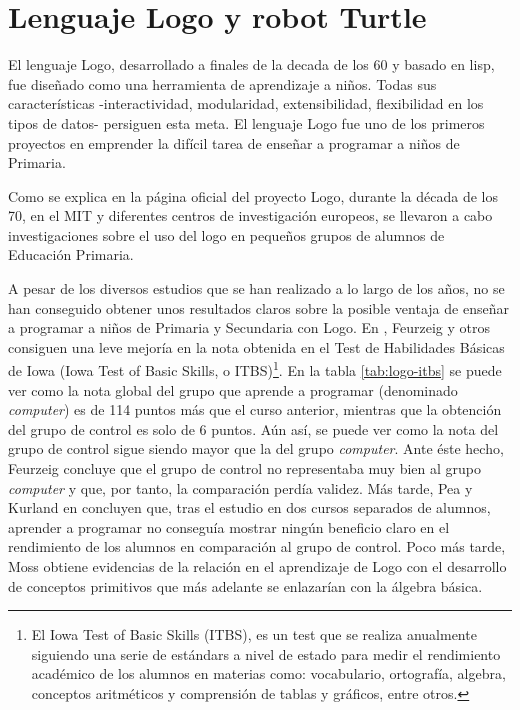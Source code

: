 \section{Lenguaje Logo y robot Turtle}
\label{sec:Logo}

El lenguaje Logo, desarrollado a finales de la decada de los 60 y basado en \Gls{lisp}, fue diseñado como una herramienta de aprendizaje a niños. Todas sus características -interactividad, modularidad, extensibilidad, flexibilidad en los tipos de datos- persiguen esta meta. El lenguaje Logo fue uno de los primeros proyectos en emprender la difícil tarea de enseñar a programar a niños de Primaria.


Como se explica en la página oficial del proyecto Logo\cite{logo}, durante la década de los 70, en el \acrfull{MIT} y diferentes centros de investigación europeos, se llevaron a cabo investigaciones sobre el uso del \Gls{logo} en pequeños grupos de alumnos de Educación Primaria.

A pesar de los diversos estudios que se han realizado a lo largo de los años, no se han conseguido obtener unos resultados claros sobre la posible ventaja de enseñar a programar a niños de Primaria y Secundaria con Logo. En \cite{feurzeig1969programming}, Feurzeig y otros consiguen una leve mejoría en la nota obtenida en el Test de Habilidades Básicas de Iowa (Iowa Test of Basic Skills, o ITBS)\footnote{El Iowa Test of Basic Skills (ITBS), es un test que se realiza anualmente siguiendo una serie de estándars a nivel de estado para medir el rendimiento académico de los alumnos en materias como: vocabulario, ortografía, algebra, conceptos aritméticos y comprensión de tablas y gráficos, entre otros.}. En la tabla \ref{tab:logo-itbs} se puede ver como la nota global del grupo que aprende a programar (denominado \emph{computer}) es de 114 puntos más que el curso anterior, mientras que la obtención del grupo de control es solo de 6 puntos. Aún así, se puede ver como la nota del grupo de control sigue siendo mayor que la del grupo \emph{computer}. Ante éste hecho, Feurzeig concluye que el grupo de control no representaba muy bien al grupo \emph{computer} y que, por tanto, la comparación perdía validez.
Más tarde, Pea y Kurland en \cite{pea1984logo} concluyen que, tras el estudio en dos cursos separados de alumnos, aprender a programar no conseguía mostrar ningún beneficio claro en el rendimiento de los alumnos en comparación al grupo de control.
Poco más tarde, Moss \cite{moss1985creating} obtiene evidencias de la relación en el aprendizaje de Logo con el desarrollo de conceptos primitivos que más adelante se enlazarían con la álgebra básica.


